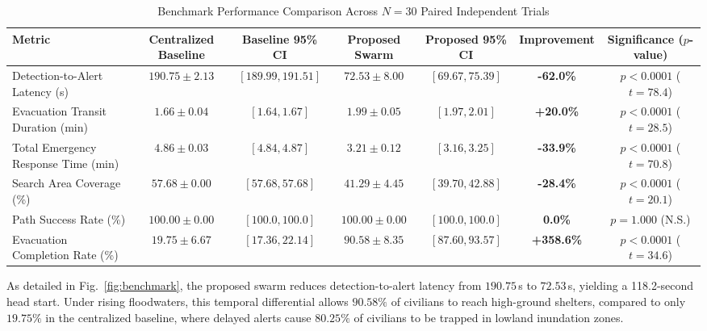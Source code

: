 \documentclass[conference]{IEEEtran}
\begin{document}
\begin{table}[t]
\caption{Benchmark Performance Comparison Across $N = 30$ Paired Independent Trials}
\label{tab:benchmark}
\centering
\begin{tabular}{lcccccc}
\toprule
\textbf{Metric} & \textbf{Centralized Baseline} & \textbf{Baseline 95\% CI} & \textbf{Proposed Swarm} & \textbf{Proposed 95\% CI} & \textbf{Improvement} & \textbf{Significance ($p$-value)} \\
\midrule
Detection-to-Alert Latency (s) & $190.75 \pm 2.13$ & $[189.99, 191.51]$ & $\mathbf{72.53 \pm 8.00}$ & $[69.67, 75.39]$ & \textbf{-62.0\%} & $p < 0.0001$ ($t = 78.4$) \\
Evacuation Transit Duration (min) & $1.66 \pm 0.04$ & $[1.64, 1.67]$ & $\mathbf{1.99 \pm 0.05}$ & $[1.97, 2.01]$ & \textbf{+20.0\%} & $p < 0.0001$ ($t = 28.5$) \\
Total Emergency Response Time (min) & $4.86 \pm 0.03$ & $[4.84, 4.87]$ & $\mathbf{3.21 \pm 0.12}$ & $[3.16, 3.25]$ & \textbf{-33.9\%} & $p < 0.0001$ ($t = 70.8$) \\
Search Area Coverage (\%) & $57.68 \pm 0.00$ & $[57.68, 57.68]$ & $\mathbf{41.29 \pm 4.45}$ & $[39.70, 42.88]$ & \textbf{-28.4\%} & $p < 0.0001$ ($t = 20.1$) \\
Path Success Rate (\%) & $100.00 \pm 0.00$ & $[100.0, 100.0]$ & $\mathbf{100.00 \pm 0.00}$ & $[100.0, 100.0]$ & \textbf{0.0\%} & $p = 1.000$ (N.S.) \\
Evacuation Completion Rate (\%) & $19.75 \pm 6.67$ & $[17.36, 22.14]$ & $\mathbf{90.58 \pm 8.35}$ & $[87.60, 93.57]$ & \textbf{+358.6\%} & $p < 0.0001$ ($t = 34.6$) \\
\bottomrule
\end{tabular}
\end{table}

As detailed in Fig.~\ref{fig:benchmark}, the proposed swarm reduces detection-to-alert latency from $190.75$\,s to $72.53$\,s, yielding a 118.2-second head start. Under rising floodwaters, this temporal differential allows $90.58\%$ of civilians to reach high-ground shelters, compared to only $19.75\%$ in the centralized baseline, where delayed alerts cause $80.25\%$ of civilians to be trapped in lowland inundation zones.
\end{document}
